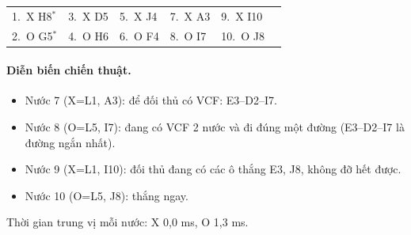 {\footnotesize\linespread{1}\selectfont
\noindent\begin{tabularx}{\linewidth}{*{6}{X}}
\toprule
1.~X H8$^\ast$ & 3.~X D5 & 5.~X J4 & 7.~X A3 & 9.~X I10 &  \\
2.~O G5$^\ast$ & 4.~O H6 & 6.~O F4 & 8.~O I7 & 10.~O J8 &  \\
\bottomrule
\end{tabularx}\par}
\paragraph{Diễn biến chiến thuật.}
\begin{itemize}\footnotesize\linespread{1.1}\selectfont
\setlength{\itemsep}{0pt}
  \item Nước 7 (X=L1, A3): để đối thủ có VCF: E3--D2--I7.
  \item Nước 8 (O=L5, I7): đang có VCF 2 nước và đi đúng một đường (E3--D2--I7 là đường ngắn nhất).
  \item Nước 9 (X=L1, I10): đối thủ đang có các ô thắng E3, J8, không đỡ hết được.
  \item Nước 10 (O=L5, J8): thắng ngay.
\end{itemize}
Thời gian trung vị mỗi nước: X 0,0 ms, O 1,3 ms.
\clearpage

